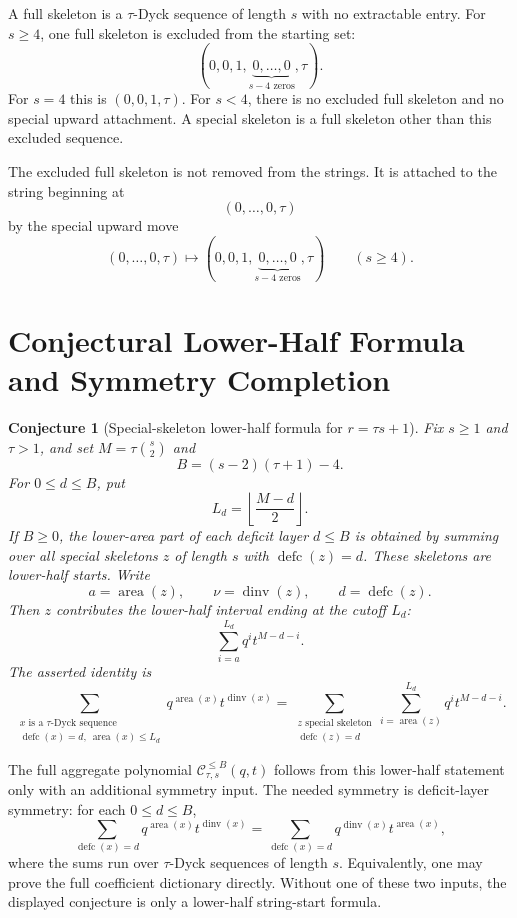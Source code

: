 \documentclass{article}
\newcommand{\defc}{\operatorname{defc}}
\newcommand{\dinv}{\operatorname{dinv}}
\newcommand{\area}{\operatorname{area}}
\newtheorem{conjecture}{Conjecture}
\begin{document}
A full skeleton is a \(\tau\)-Dyck sequence of length \(s\) with no extractable entry.
For \(s\ge4\), one full skeleton is excluded from the starting set:
\[
  (0,0,1,\underbrace{0,\ldots,0}_{s-4\text{ zeros}},\tau).
\]
For \(s=4\) this is \((0,0,1,\tau)\).  For \(s<4\), there is no excluded full
skeleton and no special upward attachment.  A special skeleton is a full
skeleton other than this excluded sequence.

The excluded full skeleton is not removed from the strings.  It is attached to
the string beginning at
\[
  (0,\ldots,0,\tau)
\]
by the special upward move
\[
  (0,\ldots,0,\tau)
  \longmapsto
  (0,0,1,\underbrace{0,\ldots,0}_{s-4\text{ zeros}},\tau)
  \qquad(s\ge4).
\]

\section{Conjectural Lower-Half Formula and Symmetry Completion}

\begin{conjecture}[Special-skeleton lower-half formula for \(r=\tau s+1\)]
Fix \(s\ge1\) and \(\tau>1\), and set \(M=\tau\binom{s}{2}\) and
\[
  B=(s-2)(\tau+1)-4.
\]
For \(0\le d\le B\), put
\[
  L_d=\left\lfloor\frac{M-d}{2}\right\rfloor.
\]
If \(B\ge0\), the lower-area part of each deficit layer \(d\le B\) is obtained
by summing over all special skeletons \(z\) of length \(s\) with
\(\defc(z)=d\).  These skeletons are lower-half starts.  Write
\[
  a=\area(z),\qquad \nu=\dinv(z),\qquad d=\defc(z).
\]
Then \(z\) contributes the lower-half interval ending at the cutoff \(L_d\):
\[
  \sum_{i=a}^{L_d} q^i t^{M-d-i}.
\]
The asserted identity is
\[
  \sum_{\substack{x\text{ is a }\tau\text{-Dyck sequence}\\
                  \defc(x)=d,\ \area(x)\le L_d}}
      q^{\area(x)}t^{\dinv(x)}
  =
  \sum_{\substack{z\text{ special skeleton}\\ \defc(z)=d}}
      \sum_{i=\area(z)}^{L_d} q^i t^{M-d-i}.
\]
\end{conjecture}

The full aggregate polynomial \(\mathcal C_{\tau,s}^{\le B}(q,t)\) follows
from this lower-half statement only with an additional symmetry input.  The
needed symmetry is deficit-layer symmetry: for each \(0\le d\le B\),
\[
  \sum_{\defc(x)=d}q^{\area(x)}t^{\dinv(x)}
  =
  \sum_{\defc(x)=d}q^{\dinv(x)}t^{\area(x)},
\]
where the sums run over \(\tau\)-Dyck sequences of length \(s\).
Equivalently, one may prove the full coefficient dictionary directly.  Without
one of these two inputs, the displayed conjecture is only a lower-half
string-start formula.
\end{document}
